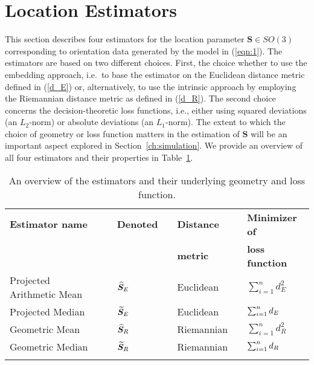 \section{Location Estimators}\label{sec:estimators}
This section describes four estimators for the location parameter $\bm{S}\in SO(3)$ corresponding to orientation data generated by the model in (\ref{eqn:1}). The estimators are based on two different choices. First, the choice whether to use the embedding approach, i.e.~to base the estimator on the Euclidean distance metric  defined in (\ref{d_E}) or, alternatively, to use the intrinsic approach by employing the Riemannian distance metric as defined in (\ref{d_R}). The second choice concerns the decision-theoretic loss functions, i.e., either using squared deviations  (an $L_2$-norm) or  absolute deviations (an $L_1$-norm).  The extent to which the choice of geometry or loss function matters in the estimation of $\bm{S}$ will be an important aspect explored in Section~\ref{ch:simulation}.  We provide an overview of all four estimators and their properties in Table~\ref{tab:ests.sum}.

\begin{table}[h]
\caption{An overview of the estimators and their underlying geometry and loss function.}  \label{tab:ests.sum}
\centering
\begin{tabular}{ lclclcl}\hline
\rule[2mm]{0mm}{1mm} \textbf{Estimator name} & & \textbf{Denoted} & & \textbf{Distance} &&\textbf{Minimizer of}\\ 
\rule[2mm]{0mm}{1mm}  & &  & & \textbf{metric} &&\textbf{loss function}\\ 
\hline \hline 
\rule[2mm]{0mm}{6mm} Projected Arithmetic Mean & & ${\widehat{\bm S}_E}$ & & Euclidean &&$\sum_{i=1}^n d^2_E$  \\
\rule[2mm]{0mm}{6mm} Projected Median & & ${\widetilde{\bm S}_E}$ & & Euclidean && $\sum_{i=1}^n{d_E}$ \\
\rule[2mm]{0mm}{6mm} Geometric Mean & & ${\widehat{\bm S}_R}$&  & Riemannian && $\sum_{i=1}^n d^2_R$\\
\rule[2mm]{0mm}{6mm} Geometric Median & & ${\widetilde{\bm S}_R}$&  & Riemannian &&$\sum_{i=1}^n{d_R}$ \\[-7mm] 
\rule[2mm]{0mm}{6mm} & & & & \\ \hline
\end{tabular}
\end{table}

